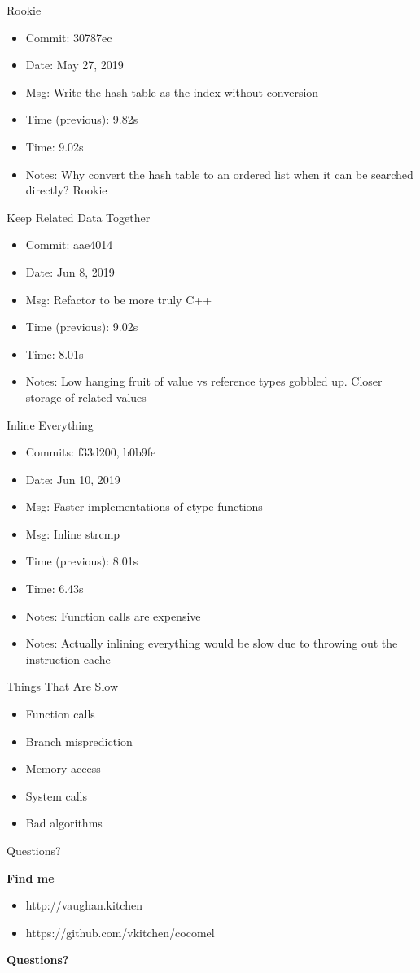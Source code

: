 \documentclass{beamer}
\newcommand\heading[1]{%
  \par\bigskip
  {\Large\bfseries#1}\par\smallskip}
\begin{document}
\begin{frame}{Rookie}
	\begin{itemize}
	\item Commit: 30787ec
	\item Date: May 27, 2019
	\item Msg: Write the hash table as the index without conversion
	\item Time (previous): 9.82s
	\item Time: 9.02s
	\item Notes: Why convert the hash table to an ordered list when it can be searched directly? Rookie
	\end{itemize}
\end{frame}

\begin{frame}{Keep Related Data Together}
	\begin{itemize}
	\item Commit: aae4014
	\item Date: Jun 8, 2019
	\item Msg: Refactor to be more truly C++
	\item Time (previous): 9.02s
	\item Time: 8.01s
	\item Notes: Low hanging fruit of value vs reference types gobbled up. Closer storage of related values
	\end{itemize}
\end{frame}

\begin{frame}{Inline Everything}
	\begin{itemize}
	\item Commits: f33d200, b0b9fe
	\item Date: Jun 10, 2019
	\item Msg: Faster implementations of ctype functions
	\item Msg: Inline strcmp
	\item Time (previous): 8.01s
	\item Time: 6.43s
	\item Notes: Function calls are expensive
	\item Notes: Actually inlining everything would be slow due to throwing out the instruction cache
	\end{itemize}
\end{frame}

\begin{frame}{Things That Are Slow}
	\begin{itemize}
	\item Function calls
	\item Branch misprediction
	\item Memory access
	\item System calls
	\item Bad algorithms
	\end{itemize}
\end{frame}

\begin{frame}{Questions?}
	\heading{Find me}
	\begin{itemize}
	\item http://vaughan.kitchen
	\item https://github.com/vkitchen/cocomel
	\end{itemize}
	\heading{Questions?}
\end{frame}
\end{document}
